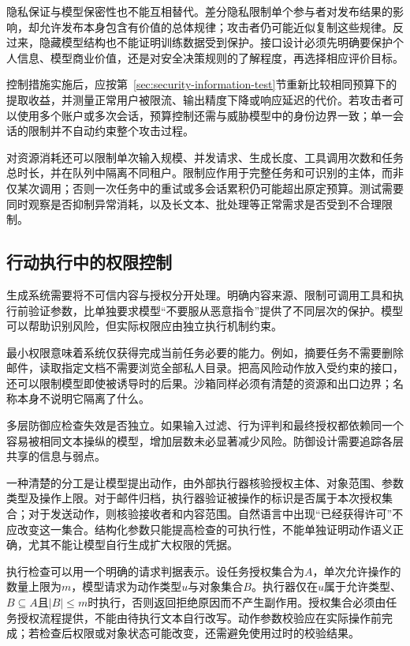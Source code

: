 隐私保证与模型保密性也不能互相替代。差分隐私限制单个参与者对发布结果的影响，却允许发布本身包含有价值的总体规律；攻击者仍可能近似复制这些规律。反过来，隐藏模型结构也不能证明训练数据受到保护。接口设计必须先明确要保护个人信息、模型商业价值，还是对安全决策规则的了解程度，再选择相应评价目标。

控制措施实施后，应按第~\ref{sec:security-information-test}节重新比较相同预算下的提取收益，并测量正常用户被限流、输出精度下降或响应延迟的代价。若攻击者可以使用多个账户或多次会话，预算控制还需与威胁模型中的身份边界一致；单一会话的限制并不自动约束整个攻击过程。

对资源消耗还可以限制单次输入规模、并发请求、生成长度、工具调用次数和任务总时长，并在队列中隔离不同租户。限制应作用于完整任务和可识别的主体，而非仅某次调用；否则一次任务中的重试或多会话累积仍可能超出原定预算。测试需要同时观察是否抑制异常消耗，以及长文本、批处理等正常需求是否受到不合理限制。

\subsection{行动执行中的权限控制}
\label{sec:security-execution-defense}

生成系统需要将不可信内容与授权分开处理。明确内容来源、限制可调用工具和执行前验证参数，比单独要求模型“不要服从恶意指令”提供了不同层次的保护。模型可以帮助识别风险，但实际权限应由独立执行机制约束。

最小权限意味着系统仅获得完成当前任务必要的能力。例如，摘要任务不需要删除邮件，读取指定文档不需要浏览全部私人目录。把高风险动作放入受约束的接口，还可以限制模型即使被诱导时的后果。沙箱同样必须有清楚的资源和出口边界；名称本身不说明它隔离了什么。

多层防御应检查失效是否独立。如果输入过滤、行为评判和最终授权都依赖同一个容易被相同文本操纵的模型，增加层数未必显著减少风险。防御设计需要追踪各层共享的信息与弱点。

一种清楚的分工是让模型提出动作，由外部执行器核验授权主体、对象范围、参数类型及操作上限。对于邮件归档，执行器验证被操作的标识是否属于本次授权集合；对于发送动作，则核验接收者和内容范围。自然语言中出现“已经获得许可”不应改变这一集合。结构化参数只能提高检查的可执行性，不能单独证明动作语义正确，尤其不能让模型自行生成扩大权限的凭据。

执行检查可以用一个明确的请求判据表示。设任务授权集合为$A$，单次允许操作的数量上限为$m$，模型请求为动作类型$u$与对象集合$B$。执行器仅在$u$属于允许类型、$B\subseteq A$且$|B|\leq m$时执行，否则返回拒绝原因而不产生副作用。授权集合必须由任务授权流程提供，不能由待执行文本自行改写。动作参数校验应在实际操作前完成；若检查后权限或对象状态可能改变，还需避免使用过时的校验结果。

